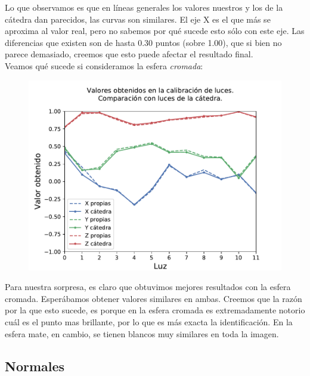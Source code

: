 Lo que observamos es que en líneas generales los valores nuestros y los de la cátedra dan parecidos, las curvas son similares. El eje X es el que más se aproxima al valor real, pero no sabemos por qué sucede esto sólo con este eje. Las diferencias que existen son de hasta 0.30 puntos (sobre 1.00), que si bien no parece demasiado, creemos que esto puede afectar el resultado final. \\

Veamos qué sucede si consideramos la esfera \textit{cromada}:

{\centering
\begin{figure}[H]
\centering
    \includegraphics[scale=0.80]{informe/imagenes/lucesComparacionFinal.pdf}
    \end{figure}
}

Para nuestra sorpresa, es claro que obtuvimos mejores resultados con la esfera cromada. Esperábamos obtener valores similares en ambas. Creemos que la razón por la que esto sucede, es porque en la esfera cromada es extremadamente notorio cuál es el punto mas brillante, por lo que es más exacta la identificación. En la esfera mate, en cambio, se tienen blancos muy similares en toda la imagen. \\

\newpage
\subsection{Normales}

